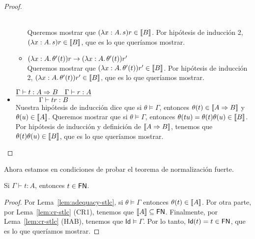 \begin{proof}
\begin{itemize}
\begin{itemize}
        \\ Queremos mostrar que \( (\lambda x : A\ldotp s) r \in \llbracket B\rrbracket \). Por hipótesis de inducción 2, \( (\lambda x : A\ldotp s) r \in \llbracket B\rrbracket \), que es lo que queríamos mostrar.
        \item \( (\lambda x : A\ldotp\theta'(t)) r \rightarrow (\lambda x : A\ldotp\theta'(t)) r' \)
        \\ Queremos mostrar que \( (\lambda x : A\ldotp\theta'(t)) r' \in \llbracket B\rrbracket \). Por hipótesis de inducción 2, \( (\lambda x : A\ldotp\theta'(t)) r' \in \llbracket B\rrbracket \), que es lo que queríamos mostrar.
      \end{itemize}
    \item \( \infer{\Gamma \vdash \app{t}{r} : B}{\Gamma \vdash t : A \Rightarrow B & \Gamma \vdash r : A} \)
      \\ Nuestra hipótesis de inducción dice que si \( \theta \models \Gamma \), entonces \( \theta(t) \in \llbracket A \Rightarrow B\rrbracket \) y \( \theta(u) \in \llbracket A\rrbracket \).
      Queremos mostrar que si \( \theta \models \Gamma \), entonces \( \theta(t u) = \theta(t) \theta(u) \in \llbracket B\rrbracket \).
      \\ Por hipótesis de inducción y definición de \( \llbracket A \Rightarrow B\rrbracket \), tenemos que \( \theta(t) \theta(u) \in \llbracket B\rrbracket \), que es lo que queríamos mostrar.
      \qedhere
  \end{itemize}
\end{proof}

Ahora estamos en condiciones de probar el teorema de normalización fuerte.

\begin{theorem}
  Si \( \Gamma \vdash t : A \), entonces \( t \in \mathsf{FN} \).
\end{theorem}

\begin{proof}
  Por Lema~\ref{lem:adequacy-stlc}, si \( \theta \models \Gamma \) entonces \( \theta(t) \in \llbracket A\rrbracket \). Por otra parte, por Lema~\ref{lem:cr-stlc} (CR1), tenemos que \( \llbracket A\rrbracket \subseteq \mathsf{FN} \).
  Finalmente, por Lema~\ref{lem:cr-stlc} (HAB), tenemos que \( \mathsf{Id} \models \Gamma \).
  Por lo tanto, \( \mathsf{Id}(t) = t \in \mathsf{FN} \), que es lo que queríamos mostrar.
\end{proof}
